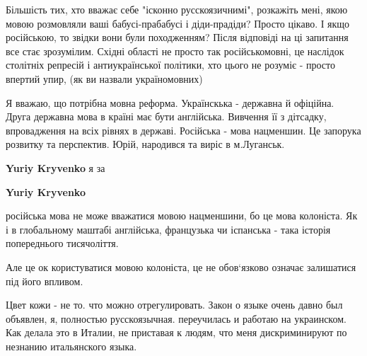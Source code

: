 \begin{itemize}
Більшість тих, хто вважає себе "ісконно русскоязичнимі", розкажіть мені, якою
мовою розмовляли ваші бабусі-прабабусі і діди-прадіди? Просто цікаво. І якщо
російською, то звідки вони були походженням? Після відповіді на ці запитання
все стає зрозумілим. Східні області не просто так російськомовні, це наслідок
столітніх репресій і антиукраїнської політики, хто цього не розуміє - просто
впертий упир, (як ви назвали україномовних)


 

Я вважаю, що потрібна мовна реформа. Українскька - державна й офіційна. Друга
державна мова в країні має бути англійська. Вивчення її з дітсадку,
впровадження на всіх рівнях в державі. Російська - мова нацменшин. Це запорука
розвитку та перспектив. Юрій, народився та виріс в м.Луганськ.

\begin{itemize}
 
\textbf{Yuriy Kryvenko} я за

 

\textbf{Yuriy Kryvenko} 

російська мова не може вважатися мовою нацменшини, бо це мова колоніста. Як і в
глобальному маштабі англійська, французька чи іспанська - така історія
попереднього тисячоліття.

Але це ок користуватися мовою колоніста, це не обов‘язково означає залишатися
під його впливом.
\end{itemize}

 

Цвет кожи - не то. что можно отрегулировать. Закон о языке очень давно был
объявлен, я, полностью русскоязычная. переучилась и работаю на украинском. Как
делала это в Италии, не приставая к людям, что меня дискриминируют по незнанию
итальянского языка.


\end{itemize}
